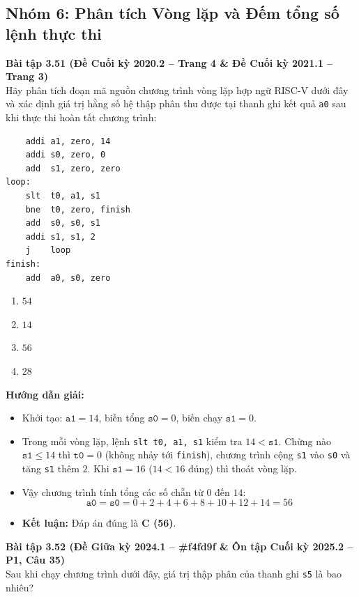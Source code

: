 \subsection{Nhóm 6: Phân tích Vòng lặp và Đếm tổng số lệnh thực thi}

\textbf{Bài tập 3.51 (Đề Cuối kỳ 2020.2 -- Trang 4 \& Đề Cuối kỳ 2021.1 -- Trang 3)}\\
Hãy phân tích đoạn mã nguồn chương trình vòng lặp hợp ngữ RISC-V dưới đây và xác định giá trị hằng số hệ thập phân thu được tại thanh ghi kết quả \texttt{a0} sau khi thực thi hoàn tất chương trình:

\noindent\begin{minipage}{\linewidth}
\begin{lstlisting}
    addi a1, zero, 14
    addi s0, zero, 0
    add  s1, zero, zero
loop:
    slt  t0, a1, s1
    bne  t0, zero, finish
    add  s0, s0, s1
    addi s1, s1, 2
    j    loop
finish:
    add  a0, s0, zero
\end{lstlisting}
\end{minipage}
\begin{enumerate}[label=\Alph*.]
    \item $54$
    \item $14$
    \item $56$
    \item $28$
\end{enumerate}
\textbf{Hướng dẫn giải:}
\begin{itemize}
    \item Khởi tạo: $\texttt{a1} = 14$, biến tổng $\texttt{s0} = 0$, biến chạy $\texttt{s1} = 0$.
    \item Trong mỗi vòng lặp, lệnh \texttt{slt t0, a1, s1} kiểm tra $14 < \texttt{s1}$. Chừng nào $\texttt{s1} \le 14$ thì $\texttt{t0} = 0$ (không nhảy tới \texttt{finish}), chương trình cộng \texttt{s1} vào \texttt{s0} và tăng \texttt{s1} thêm $2$. Khi $\texttt{s1} = 16$ ($14 < 16$ đúng) thì thoát vòng lặp.
    \item Vậy chương trình tính tổng các số chẵn từ $0$ đến $14$:
    $$\texttt{a0} = \texttt{s0} = 0 + 2 + 4 + 6 + 8 + 10 + 12 + 14 = 56$$
    \item \textbf{Kết luận:} Đáp án đúng là \textbf{C (56)}.
\end{itemize}

\textbf{Bài tập 3.52 (Đề Giữa kỳ 2024.1 -- \#f4fd9f \& Ôn tập Cuối kỳ 2025.2 -- P1, Câu 35)}\\
Sau khi chạy chương trình dưới đây, giá trị thập phân của thanh ghi \texttt{s5} là bao nhiêu?

